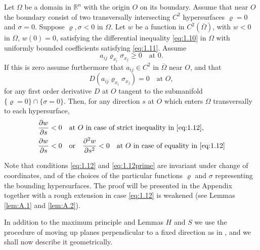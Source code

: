 \begin{lemma}
  Let $\Omega$ be a domain in $\mathbb{R}^n$ with the origin $O$ on its boundary.
  Assume that near $O$ the boundary consist of two transversally intersecting
  $C^2$ hypersurfaces $\varrho = 0$ and $\sigma = 0$.
  Suppose $\varrho,\sigma<0$ in $\Omega$. Let $w$ be a function in $C^2(\overline{\Omega})$,
  with $w<0$ in $\Omega$, $w(0)=0$, satisfying the differential inequality \eqref{eq:1.10}
  in $\Omega$ with uniformly bounded coefficients satisfying \eqref{eq:1.11}. Assume
  \begin{equation}\label{eq:1.12}
    a_{ij}\varrho_{x_i}\sigma_{x_j} \geq 0\quad \text{at } 0.
  \end{equation}
  If this is zero assume furthermore that $a_{ij}\in C^2$ in $\overline{\Omega}$
  near $O$, and that
  \begin{equation}\label{eq:1.12prime}
    D(a_{ij}\varrho_{x_i}\sigma_{x_j}) = 0 \quad \text{at } O, \tag{$1.12'$}
  \end{equation}
  for any first order derivative $D$ at $O$ tangent to the submanifold
  $\{\varrho=0\}\cap \{\sigma=0\}$.
  Then, for any direction $s$ at $O$ which enters $\Omega$ transversally to each hypersurface,
  \begin{equation}\label{eq:1.13}
    \begin{aligned}
      & \frac{\partial w}{\partial s} < 0 \quad\text{at } O 
        \text{ in case of strict inequality in \eqref{eq:1.12}}, \\
      & \frac{\partial w}{\partial s} < 0\quad \text{or} \quad
        \frac{\partial^2w}{\partial s^2} < 0\quad
        \text{at } O \text{ in case of equality in \eqref{eq:1.12}}
    \end{aligned}
  \end{equation}
\end{lemma}

Note that conditions \eqref{eq:1.12} and \eqref{eq:1.12prime} are invariant under
change of coordinates, and of the choices of the particular functions $\varrho$ 
and $\sigma$ representing the bounding hypersurfaces.
The proof will be presented in the Appendix together with a rough extension
in case \eqref{eq:1.12} is weakened (see Lemmas \ref{lem:A.1} and \ref{lem:A.2}).

In addition to the maximum principle and Lemmas $H$ and $S$
we use the procedure of moving up planes perpendicular to a fixed direction as in \cite{serrin_symmetry_1971},
and we shall now describe it geometrically.

